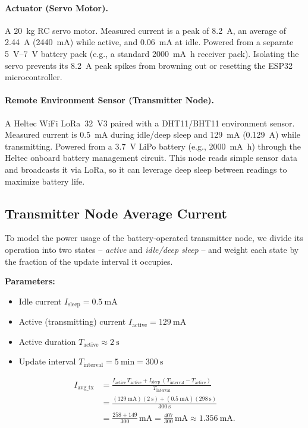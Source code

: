 \documentclass[11pt,letterpaper]{article}
\begin{document}
\paragraph{Actuator (Servo Motor).}
A \SI{20}{\kilogram} RC servo motor. Measured current is a peak of
\SI{8.2}{\ampere}, an average of \SI{2.44}{\ampere}
(\SI{2440}{\milli\ampere}) while active, and \SI{0.06}{\milli\ampere}
at idle. Powered from a separate \SIrange{5}{7}{\volt} battery pack
(e.g., a standard \SI{2000}{\milli\ampere\hour} receiver pack).
Isolating the servo prevents its \SI{8.2}{\ampere} peak spikes from
browning out or resetting the ESP32 microcontroller.

\paragraph{Remote Environment Sensor (Transmitter Node).}
A Heltec WiFi LoRa~32~V3 paired with a DHT11/BHT11 environment sensor.
Measured current is \SI{0.5}{\milli\ampere} during idle/deep sleep
and \SI{129}{\milli\ampere} (\SI{0.129}{\ampere}) while transmitting.
Powered from a \SI{3.7}{\volt} LiPo battery (e.g.,
\SI{2000}{\milli\ampere\hour}) through the Heltec onboard battery
management circuit. This node reads simple sensor data and broadcasts
it via LoRa, so it can leverage deep sleep between readings to
maximize battery life.

\subsection{Transmitter Node Average Current}
To model the power usage of the battery-operated transmitter node, we
divide its operation into two states -- \emph{active} and
\emph{idle/deep sleep} -- and weight each state by the fraction of the
update interval it occupies.

\textbf{Parameters:}
\begin{itemize}[leftmargin=*]
    \item Idle current \(I_{\text{sleep}} = \SI{0.5}{\milli\ampere}\)
    \item Active (transmitting) current
          \(I_{\text{active}} = \SI{129}{\milli\ampere}\)
    \item Active duration \(T_{\text{active}} \approx \SI{2}{\second}\)
    \item Update interval
          \(T_{\text{interval}} = \SI{5}{\minute} = \SI{300}{\second}\)
\end{itemize}

\begin{align*}
I_{\text{avg\_tx}}
&= \frac{I_{\text{active}}\,T_{\text{active}}
        + I_{\text{sleep}}\,(T_{\text{interval}}-T_{\text{active}})}
       {T_{\text{interval}}} \\[4pt]
&= \frac{(\SI{129}{\milli\ampere})(\SI{2}{\second})
        + (\SI{0.5}{\milli\ampere})(\SI{298}{\second})}
       {\SI{300}{\second}} \\[4pt]
&= \frac{258 + 149}{300}\,\si{\milli\ampere}
 = \frac{407}{300}\,\si{\milli\ampere}
 \approx \SI{1.356}{\milli\ampere}.
\end{align*}
\end{document}
